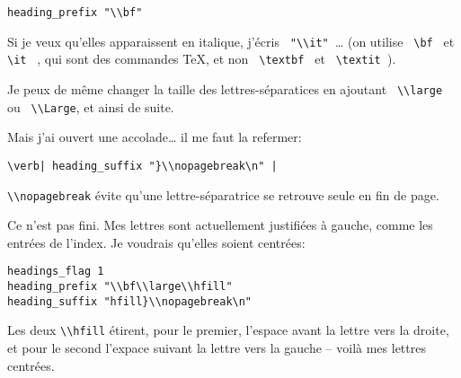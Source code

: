 \begin{verbatim}
heading_prefix "\\bf"
\end{verbatim} 

Si je veux qu'elles apparaissent en italique, j'écris \verb| "\\it" |… (on utilise \verb+ \bf + et \verb+ \it + , qui sont des commandes \TeX, et non \verb+ \textbf + et \verb+ \textit +).

Je peux de même changer la taille des lettres-séparatices en ajoutant \verb| \\large | ou \verb| \\Large|, et ainsi de suite. 

Mais j'ai ouvert une accolade… il me faut la refermer:

\begin{verbatim}
\verb| heading_suffix "}\\nopagebreak\n" | 
\end{verbatim}

\verb|\\nopagebreak| évite qu'une lettre-séparatrice se retrouve seule en fin de page. 



Ce n'est pas fini. Mes lettres sont actuellement justifiées à gauche, comme les entrées de l'index. Je voudrais qu'elles soient centrées: 

\begin{verbatim}
headings_flag 1
heading_prefix "\\bf\\large\\hfill" 
heading_suffix "hfill}\\nopagebreak\n" 
\end{verbatim}

Les deux \verb|\\hfill| étirent, pour le premier, l'espace avant la lettre vers la droite, et pour le second l'expace suivant la lettre vers la gauche -- voilà mes lettres centrées.

